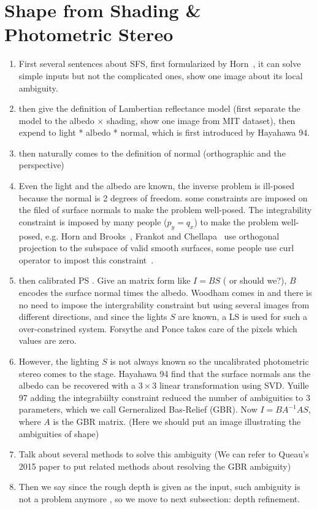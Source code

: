 \section{Shape from Shading \& Photometric Stereo}

\begin{enumerate}
\item First several sentences about SFS, first formularized by  Horn~\cite{horn1970shape}, it can solve simple inputs but not the complicated ones, show one image about its local ambiguity. 

\item then give the definition of Lambertian reflectance model (first separate the model to the albedo $\times$ shading, show one image from MIT dataset), then expend to light * albedo * normal, which is first introduced by Hayahawa 94. 

\item then naturally comes to the definition of normal (orthographic and the perspective)

\item Even the light and the albedo are known, the inverse problem is ill-posed because the normal is 2 degrees of freedom. 
some constraints are imposed on the filed of surface normals to make the problem well-posed. The integrability constraint is imposed by many people ($p_y = q_x$) to make the problem well-posed, e.g. Horn and Brooks~\cite{horn1986variational},  {\color{red}Frankot and Chellapa~\cite{frankot1988method} use orthogonal projection to the subspace of valid smooth surfaces}, some people use curl operator to impost this constraint~\cite{han2013high}.

\item then calibrated PS . Give an matrix form like $I = BS$ ({\color{red} or should we?}), $B$ encodes the surface normal times the albedo. Woodham comes in and there is no need to impose the intergrability constraint but using several images from different directions, and since the lights $S$ are known, a LS is used for such a over-constrined system. Forsythe and Ponce takes care of the pixels which values are zero.

\item However, the lighting $S$ is not always known so the uncalibrated photometric stereo comes to the stage. Hayahawa 94 find that the surface normals ans the albedo can be recovered with a $3\times3$ linear transformation using SVD. Yuille 97 adding the integrabiilty constraint reduced the number of ambiguities to 3 parameters, which we call Gerneralized Bas-Relief (GBR). 
Now $I = B A^{-1}A S$, where $A$ is the GBR matrix.
(Here we should put an image illustrating the ambiguities of shape)

\item Talk about several methods to solve this ambiguity (We can refer to Queau's 2015 paper to put related methods about resolving the GBR ambiguity)

\item Then we say since the rough depth is given as the input, such ambiguity is not a problem anymore , so we move to next subsection: depth refinement.

\end{enumerate}

